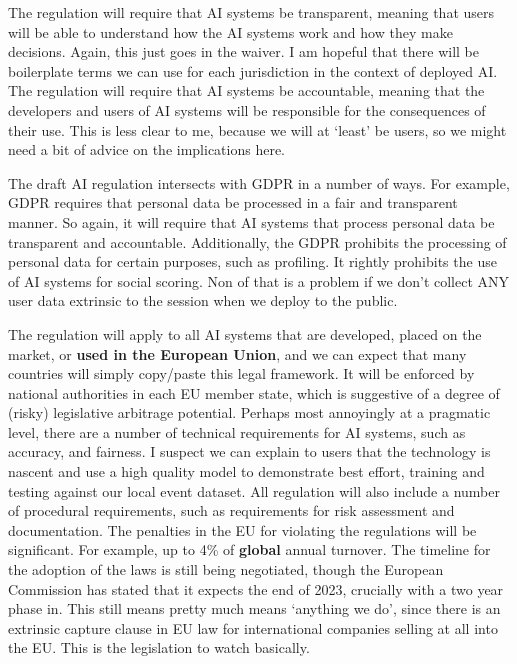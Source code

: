 The regulation will require that AI systems be transparent, meaning that users will be able to understand how the AI systems work and how they make decisions. Again, this just goes in the waiver. I am hopeful that there will be boilerplate terms we can use for each jurisdiction in the context of deployed AI. The regulation will require that AI systems be accountable, meaning that the developers and users of AI systems will be responsible for the consequences of their use. This is less clear to me, because we will at `least' be users, so we might need a bit of advice on the implications here.\par
The draft AI regulation intersects with GDPR in a number of ways. For example, GDPR requires that personal data be processed in a fair and transparent manner. So again, it will require that AI systems that process personal data be transparent and accountable. Additionally, the GDPR prohibits the processing of personal data for certain purposes, such as profiling. It rightly prohibits the use of AI systems for social scoring. Non of that is a problem if we don't collect ANY user data extrinsic to the session when we deploy to the public.\par
The regulation will apply to all AI systems that are developed, placed on the market, or \textbf{used in the European Union}, and we can expect that many countries will simply copy/paste this legal framework. It will be enforced by national authorities in each EU member state, which is suggestive of a degree of (risky) legislative arbitrage potential. Perhaps most annoyingly at a pragmatic level, there are a number of technical requirements for AI systems, such as accuracy, and fairness. I suspect we can explain to users that the technology is nascent and use a high quality model to demonstrate best effort, training and testing against our local event dataset. All regulation will also include a number of procedural requirements, such as requirements for risk assessment and documentation. The penalties in the EU for violating the regulations will be significant. For example, up to 4\% of \textbf{global} annual turnover. The timeline for the adoption of the laws is still being negotiated, though the European Commission has stated that it expects the end of 2023, crucially with a two year phase in. This still means pretty much means `anything we do', since there is an extrinsic capture clause in EU law for international companies selling at all into the EU. This is the legislation to watch basically.\par
